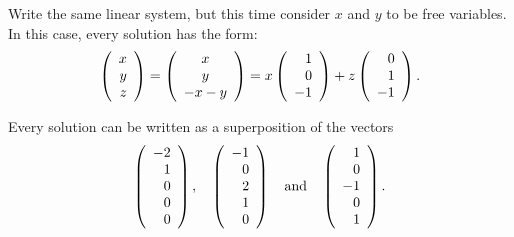 \soln Write the same linear system, but this time consider $x$ and $y$
to be free variables.  In this case, every solution has the form:
\[
\left(\begin{array}{r} x \\ y \\ z\end{array}\right) = \left(\begin{array}{c} x \\ y \\
-x - y \end{array}\right) = x\left(\begin{array}{r} 1 \\ 0 \\ -1\end{array}\right) +
z\left(\begin{array}{r} 0 \\ 1 \\ -1\end{array}\right).
\]

\ans Every solution can be written as a superposition of the vectors
\[
\left(\begin{array}{r} -2 \\ 1 \\ 0 \\ 0 \\ 0\end{array}\right), \quad
\left(\begin{array}{r} -1 \\ 0 \\ 2 \\ 1 \\ 0 \end{array}\right) \quad\mbox{and}\quad
\left(\begin{array}{r} 1 \\ 0 \\ -1 \\ 0 \\ 1 \end{array}\right).
\]

